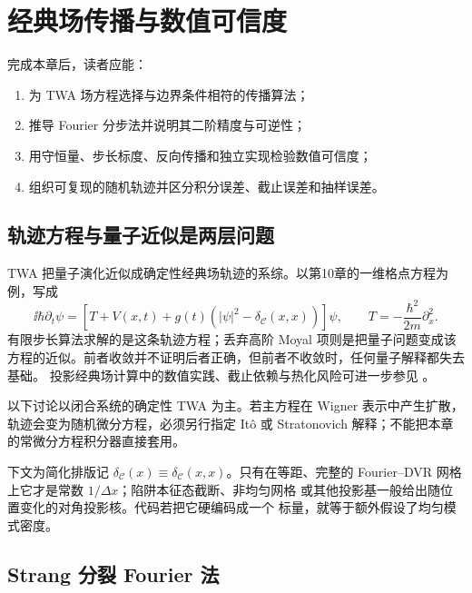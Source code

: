 \chapter{经典场传播与数值可信度}
\label{ch:propagation}

\begin{learningobjectives}
完成本章后，读者应能：
\begin{enumerate}
  \item 为 TWA 场方程选择与边界条件相符的传播算法；
  \item 推导 Fourier 分步法并说明其二阶精度与可逆性；
  \item 用守恒量、步长标度、反向传播和独立实现检验数值可信度；
  \item 组织可复现的随机轨迹并区分积分误差、截止误差和抽样误差。
\end{enumerate}
\end{learningobjectives}

\section{轨迹方程与量子近似是两层问题}

TWA 把量子演化近似成确定性经典场轨迹的系综。以第10章的一维格点方程为例，写成
\begin{equation}
  \ii\hbar\partial_t\psi
  =\left[T+V(x,t)+g(t)(|\psi|^2-\delta_{\mathcal C}(x,x))\right]\psi,
  \qquad
  T=-\frac{\hbar^2}{2m}\partial_x^2.
  \label{eq:propagation-field-equation}
\end{equation}
有限步长算法求解的是这条轨迹方程；丢弃高阶 Moyal 项则是把量子问题变成该方程的近似。前者收敛并不证明后者正确，但前者不收敛时，任何量子解释都失去基础。
投影经典场计算中的数值实践、截止依赖与热化风险可进一步参见
\cite{Blakie2008}。

以下讨论以闭合系统的确定性 TWA 为主。若主方程在 Wigner 表示中产生扩散，轨迹会变为随机微分方程，必须另行指定 It\^o 或 Stratonovich 解释；不能把本章的常微分方程积分器直接套用。

下文为简化排版记
$\delta_{\mathcal C}(x)\equiv\delta_{\mathcal C}(x,x)$。只有在等距、完整的
Fourier--DVR 网格上它才是常数 $1/\Delta x$；陷阱本征态截断、非均匀网格
或其他投影基一般给出随位置变化的对角投影核。代码若把它硬编码成一个
标量，就等于额外假设了均匀模式密度。

\section{Strang 分裂 Fourier 法}

